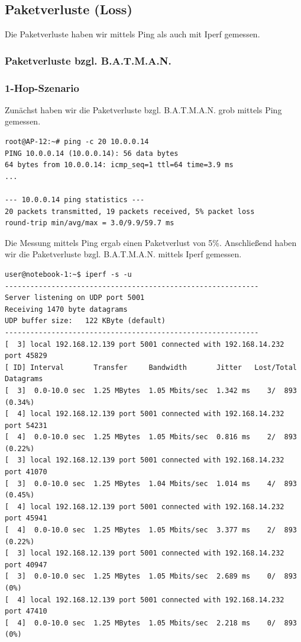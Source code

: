 \documentclass[a4paper,10pt]{article}
\begin{document}
\subsection{Paketverluste (Loss)}

Die Paketverluste haben wir mittels Ping als auch mit Iperf gemessen.

\subsubsection{Paketverluste bzgl. B.A.T.M.A.N.}

\subsubsection*{1-Hop-Szenario}

Zunächst haben wir die Paketverluste bzgl. B.A.T.M.A.N. grob mittels Ping gemessen.

\begin{lstlisting}
root@AP-12:~# ping -c 20 10.0.0.14
PING 10.0.0.14 (10.0.0.14): 56 data bytes
64 bytes from 10.0.0.14: icmp_seq=1 ttl=64 time=3.9 ms
...

--- 10.0.0.14 ping statistics ---
20 packets transmitted, 19 packets received, 5% packet loss
round-trip min/avg/max = 3.0/9.9/59.7 ms
\end{lstlisting}

Die Messung mittels Ping ergab einen Paketverlust von 5\%.
Anschließend haben wir die Paketverluste bzgl. B.A.T.M.A.N. mittels Iperf gemessen.

\begin{lstlisting}
user@notebook-1:~$ iperf -s -u
------------------------------------------------------------
Server listening on UDP port 5001
Receiving 1470 byte datagrams
UDP buffer size:   122 KByte (default)
------------------------------------------------------------
[  3] local 192.168.12.139 port 5001 connected with 192.168.14.232 port 45829
[ ID] Interval       Transfer     Bandwidth       Jitter   Lost/Total Datagrams
[  3]  0.0-10.0 sec  1.25 MBytes  1.05 Mbits/sec  1.342 ms    3/  893 (0.34%)
[  4] local 192.168.12.139 port 5001 connected with 192.168.14.232 port 54231
[  4]  0.0-10.0 sec  1.25 MBytes  1.05 Mbits/sec  0.816 ms    2/  893 (0.22%)
[  3] local 192.168.12.139 port 5001 connected with 192.168.14.232 port 41070
[  3]  0.0-10.0 sec  1.25 MBytes  1.04 Mbits/sec  1.014 ms    4/  893 (0.45%)
[  4] local 192.168.12.139 port 5001 connected with 192.168.14.232 port 45941
[  4]  0.0-10.0 sec  1.25 MBytes  1.05 Mbits/sec  3.377 ms    2/  893 (0.22%)
[  3] local 192.168.12.139 port 5001 connected with 192.168.14.232 port 40947
[  3]  0.0-10.0 sec  1.25 MBytes  1.05 Mbits/sec  2.689 ms    0/  893 (0%)
[  4] local 192.168.12.139 port 5001 connected with 192.168.14.232 port 47410
[  4]  0.0-10.0 sec  1.25 MBytes  1.05 Mbits/sec  2.218 ms    0/  893 (0%)
\end{lstlisting}
\end{document}
